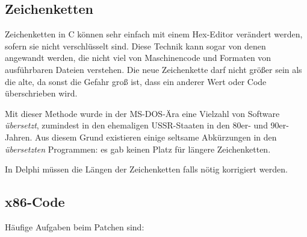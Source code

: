 
\subsection{Zeichenketten}

Zeichenketten in C können sehr einfach mit einem Hex-Editor verändert werden,
sofern sie nicht verschlüsselt sind.
Diese Technik kann sogar von denen angewandt werden, die nicht viel von Maschinencode
und Formaten von ausführbaren Dateien verstehen.
Die neue Zeichenkette darf nicht größer sein als die alte, da sonst die Gefahr
groß ist, dass ein anderer Wert oder Code überschrieben wird.

Mit dieser Methode wurde in der MS-DOS-Ära eine Vielzahl von Software \emph{übersetzt},
zumindest in den ehemaligen USSR-Staaten in den 80er- und 90er-Jahren.
Aus diesem Grund existieren einige seltsame Abkürzungen in den \emph{übersetzten}
Programmen: es gab keinen Platz für längere Zeichenketten.


In Delphi müssen die Längen der Zeichenketten falls nötig korrigiert werden.

\subsection{x86-Code}
\label{x86_patching}

Häufige Aufgaben beim Patchen sind:

